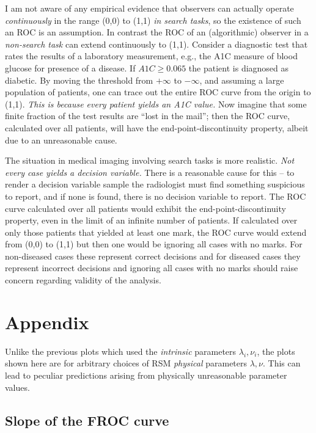 \documentclass[
]{book}
\begin{document}
I am not aware of any empirical evidence that observers can actually operate \emph{continuously} in the range (0,0) to (1,1) \emph{in search tasks}, so the existence of such an ROC is an assumption. In contrast the ROC of an (algorithmic) observer in a \emph{non-search task} can extend continuously to (1,1). Consider a diagnostic test that rates the results of a laboratory measurement, e.g., the A1C measure of blood glucose for presence of a disease. If \(A1C \ge 0.065\) the patient is diagnosed as diabetic. By moving the threshold from \(+\infty\) to \(-\infty\), and assuming a large population of patients, one can trace out the entire ROC curve from the origin to (1,1). \emph{This is because every patient yields an A1C value.} Now imagine that some finite fraction of the test results are ``lost in the mail''; then the ROC curve, calculated over all patients, will have the end-point-discontinuity property, albeit due to an unreasonable cause.

The situation in medical imaging involving search tasks is more realistic. \emph{Not every case yields a decision variable.} There is a reasonable cause for this -- to render a decision variable sample the radiologist must find something suspicious to report, and if none is found, there is no decision variable to report. The ROC curve calculated over all patients would exhibit the end-point-discontinuity property, even in the limit of an infinite number of patients. If calculated over only those patients that yielded at least one mark, the ROC curve would extend from (0,0) to (1,1) but then one would be ignoring all cases with no marks. For non-diseased cases these represent correct decisions and for diseased cases they represent incorrect decisions and ignoring all cases with no marks should raise concern regarding validity of the analysis.

\hypertarget{rsm-other-predictions-appendix}{%
\section{Appendix}\label{rsm-other-predictions-appendix}}

Unlike the previous plots which used the \emph{intrinsic} parameters \(\lambda_i, \nu_i\), the plots shown here are for arbitrary choices of RSM \emph{physical} parameters \(\lambda, \nu\). This can lead to peculiar predictions arising from physically unreasonable parameter values.

\hypertarget{rsm-other-predictions-froc-physical-parameters}{%
\subsection{Slope of the FROC curve}\label{rsm-other-predictions-froc-physical-parameters}}
\end{document}
